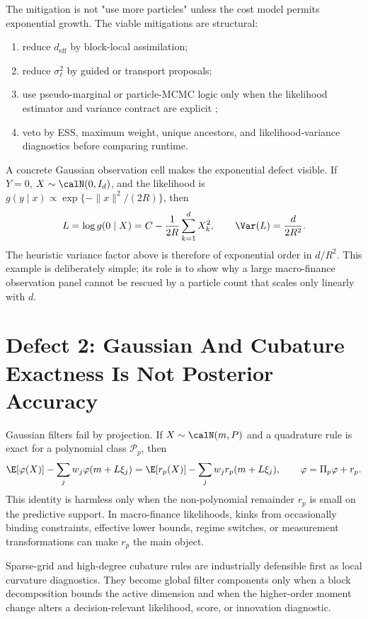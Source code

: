 The mitigation is not "use more particles" unless the cost model permits
exponential growth.  The viable mitigations are structural:
\begin{enumerate}[label=(\arabic*)]
  \item reduce \(d_{\mathrm{eff}}\) by block-local assimilation;
  \item reduce \(\sigma_\ell^2\) by guided or transport proposals;
  \item use pseudo-marginal or particle-MCMC logic only when the likelihood
    estimator and variance contract are explicit
    \citep{andrieu2009pseudo,andrieu2010particle};
  \item veto by ESS, maximum weight, unique ancestors, and likelihood-variance
    diagnostics before comparing runtime.
\end{enumerate}

A concrete Gaussian observation cell makes the exponential defect visible.  If
\(Y=0\), \(X\sim\calN(0,I_d)\), and the likelihood is
\(g(y\mid x)\propto \exp\{-\|x\|^2/(2R)\}\), then
\[
  L=\log g(0\mid X)=C-\frac{1}{2R}\sum_{k=1}^d X_k^2,\qquad
  \Var(L)=\frac{d}{2R^2}.
\]
The heuristic variance factor above is therefore of exponential order in
\(d/R^2\).  This example is deliberately simple; its role is to show why a
large macro-finance observation panel cannot be rescued by a particle count
that scales only linearly with \(d\).

\section{Defect 2: Gaussian And Cubature Exactness Is Not Posterior Accuracy}
\label{sec:bf-hd-defect-gaussian}

Gaussian filters fail by projection.  If \(X\sim\calN(m,P)\) and a quadrature
rule is exact for a polynomial class \(\mathcal P_p\), then
\begin{equation}
  \E[\varphi(X)]-\sum_j w_j\varphi(m+L\xi_j)
  =
  \E[r_p(X)]-\sum_j w_j r_p(m+L\xi_j),
  \qquad
  \varphi=\Pi_p\varphi+r_p .
  \label{eq:bf-hd-synth-quadrature-remainder}
\end{equation}
This identity is harmless only when the non-polynomial remainder \(r_p\) is
small on the predictive support.  In macro-finance likelihoods, kinks from
occasionally binding constraints, effective lower bounds, regime switches, or
measurement transformations can make \(r_p\) the main object.

\begin{proposition}
\label{prop:bf-hd-local-cubature-diagnostic}
Sparse-grid and high-degree cubature rules are industrially defensible first as
local curvature diagnostics.  They become global filter components only when a
block decomposition bounds the active dimension and when the higher-order
moment change alters a decision-relevant likelihood, score, or innovation
diagnostic.
\end{proposition}

